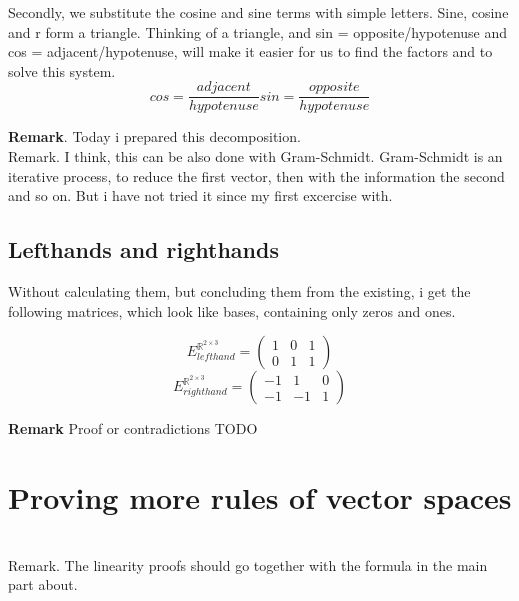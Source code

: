 \documentclass[a4paper]{article}
\begin{document}
Secondly, we substitute the cosine and sine terms with simple letters. Sine, cosine and r form a triangle. Thinking of a triangle, and sin = opposite/hypotenuse and cos = adjacent/hypotenuse, will make it easier for us to find the factors and to solve this system.\\

\begin{displaymath}
    cos = \frac{adjacent}{hypotenuse} 
    sin = \frac{opposite}{hypotenuse}
\end{displaymath}

\textbf{Remark}. Today i prepared this decomposition.\\

Remark. I think, this can be also done with Gram-Schmidt. Gram-Schmidt is an iterative process, to reduce the first vector, then with the information the second and so on. But i have not tried it since my first excercise with. \\

\subsection{Lefthands and righthands}

Without calculating them, but concluding them from the existing, i get the following matrices, which look like bases, containing only zeros and ones.

\begin{displaymath}
    E^{\mathbb{R}^{2\times{3}}}_{lefthand} = \begin{pmatrix}1&0&1\\0&1&1\end{pmatrix}
\end{displaymath}
\begin{displaymath}
    E^{\mathbb{R}^{2\times{3}}}_{righthand} = \begin{pmatrix}-1&1&0\\-1&-1&1\end{pmatrix}
\end{displaymath}

\textbf{Remark} Proof or contradictions TODO

\section{Proving more rules of vector spaces}\\

Remark. The linearity proofs should go together with the formula in the main part about.
\end{document}
